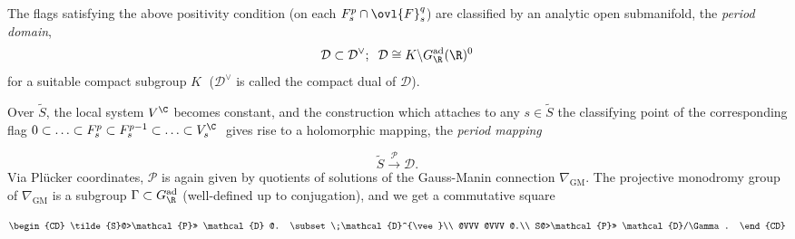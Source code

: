\begin{para}
 The flags satisfying the above positivity condition (on each $F_s^p\cap
 \ovl{F}_s^q$) are classified by an analytic open submanifold, the
 {\it period domain},
 \begin{equation*}
  \mathcal{D}\subset \mathcal{D}^\vee ;\;\; \mathcal{D}
   \cong K\backslash G_\R^{\mathrm{ad}}({\R})^{0}
 \end{equation*}
 for a suitable compact subgroup $K\;$ ($\mathcal{D}^\vee$ is called the
 compact dual of $\mathcal{D}$).


Over $\tilde S$, the local system $V^{\C}$ becomes constant, and the
construction which attaches to any $s\in \tilde S$ the classifying point
of the corresponding flag $0\subset \ldots \subset F_s^p\subset
F_s^{p-1}\subset \ldots \subset V_s^{\C}\;$ gives rise to a holomorphic
mapping, the {\it period mapping}

 \begin{equation*}
  \tilde{S}\xrightarrow{\mathcal{P}} \mathcal{D}.
 \end{equation*}
 Via Pl\"ucker coordinates, $\mathcal{P}$ is again
 given by quotients of solutions of the Gauss-Manin connection
 $\nabla_{\mathrm{GM}}$.  The projective monodromy group of
 $\nabla_{\mathrm{GM}}$ is a 
 subgroup $\Gamma \subset G_{\R}^{\mathrm{ad}}$ (well-defined up to
 conjugation), and we get a commutative square

\begin{equation*}
 \begin{CD}
  \tilde{S}@>\mathcal{P}>> \mathcal{D} @. \subset \;\mathcal{D}^{\vee}\\
  @VVV @VVV @.\\
  S@>\mathcal{P}>> \mathcal{D}/\Gamma.
 \end{CD}
\end{equation*}
\end{para}

